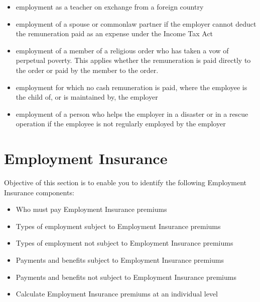 \documentclass[letterpaper,10pt,english]{sphinxmanual}
\begin{document}
\begin{itemize}
\item {} 
\sphinxAtStartPar
employment as a teacher on exchange from a foreign country

\item {} 
\sphinxAtStartPar
employment of a spouse or common\sphinxhyphen{}law partner if the employer cannot deduct the remuneration paid as an expense under the Income Tax Act

\item {} 
\sphinxAtStartPar
employment of a member of a religious order who has taken a vow of perpetual poverty. This applies whether the remuneration is paid directly to the order or paid by the member to the order.

\item {} 
\sphinxAtStartPar
employment for which no cash remuneration is paid, where the employee is the child of, or is maintained by, the employer

\item {} 
\sphinxAtStartPar
employment of a person who helps the employer in a disaster or in a rescue operation if the employee is not regularly employed by the employer

\end{itemize}


\chapter{Employment Insurance}
\label{\detokenize{cpp-and-ei:employment-insurance}}
\sphinxAtStartPar
Objective of this section is to enable you to identify the following Employment Insurance components:
\begin{itemize}
\item {} 
\sphinxAtStartPar
Who must pay Employment Insurance premiums

\item {} 
\sphinxAtStartPar
Types of employment subject to Employment Insurance premiums

\item {} 
\sphinxAtStartPar
Types of employment not subject to Employment Insurance premiums

\item {} 
\sphinxAtStartPar
Payments and benefits subject to Employment Insurance premiums

\item {} 
\sphinxAtStartPar
Payments and benefits not subject to Employment Insurance premiums

\item {} 
\sphinxAtStartPar
Calculate Employment Insurance premiums at an individual level

\end{itemize}
\end{document}
